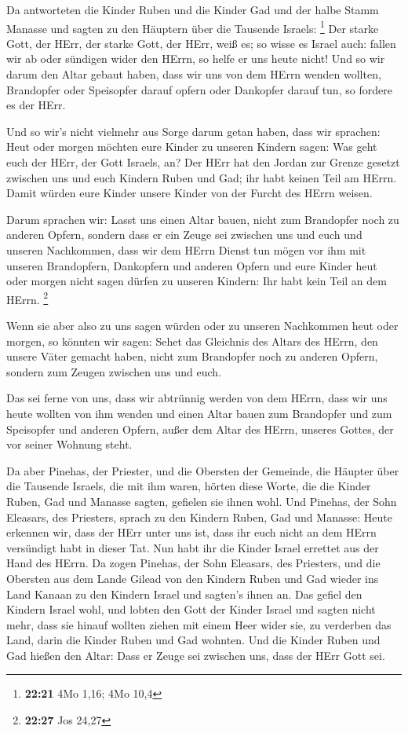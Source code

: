  Da antworteten die Kinder Ruben und die Kinder Gad und
der halbe Stamm Manasse und sagten zu den Häuptern über die Tausende
Israels: \footnote{\textbf{22:21} 4Mo 1,16; 4Mo 10,4} 
Der starke Gott, der HErr, der starke Gott, der HErr, weiß es; so wisse
es Israel auch: fallen wir ab oder sündigen wider den HErrn, so helfe er
uns heute nicht!  Und so wir darum den Altar gebaut
haben, dass wir uns von dem HErrn wenden wollten, Brandopfer oder
Speisopfer darauf opfern oder Dankopfer darauf tun, so fordere es der
HErr.

 Und so wir's nicht vielmehr aus Sorge darum getan haben,
dass wir sprachen: Heut oder morgen möchten eure Kinder zu unseren
Kindern sagen: Was geht euch der HErr, der Gott Israels, an?
 Der HErr hat den Jordan zur Grenze gesetzt zwischen uns
und euch Kindern Ruben und Gad; ihr habt keinen Teil am HErrn. Damit
würden eure Kinder unsere Kinder von der Furcht des HErrn weisen.

 Darum sprachen wir: Lasst uns einen Altar bauen, nicht
zum Brandopfer noch zu anderen Opfern,  sondern dass er
ein Zeuge sei zwischen uns und euch und unseren Nachkommen, dass wir dem
HErrn Dienst tun mögen vor ihm mit unseren Brandopfern, Dankopfern und
anderen Opfern und eure Kinder heut oder morgen nicht sagen dürfen zu
unseren Kindern: Ihr habt kein Teil an dem HErrn. \footnote{\textbf{22:27}
  Jos 24,27}

 Wenn sie aber also zu uns sagen würden oder zu unseren
Nachkommen heut oder morgen, so könnten wir sagen: Sehet das Gleichnis
des Altars des HErrn, den unsere Väter gemacht haben, nicht zum
Brandopfer noch zu anderen Opfern, sondern zum Zeugen zwischen uns und
euch.

 Das sei ferne von uns, dass wir abtrünnig werden von dem
HErrn, dass wir uns heute wollten von ihm wenden und einen Altar bauen
zum Brandopfer und zum Speisopfer und anderen Opfern, außer dem Altar
des HErrn, unseres Gottes, der vor seiner Wohnung steht.

 Da aber Pinehas, der Priester, und die Obersten der
Gemeinde, die Häupter über die Tausende Israels, die mit ihm waren,
hörten diese Worte, die die Kinder Ruben, Gad und Manasse sagten,
gefielen sie ihnen wohl.  Und Pinehas, der Sohn Eleasars,
des Priesters, sprach zu den Kindern Ruben, Gad und Manasse: Heute
erkennen wir, dass der HErr unter uns ist, dass ihr euch nicht an dem
HErrn versündigt habt in dieser Tat. Nun habt ihr die Kinder Israel
errettet aus der Hand des HErrn.  Da zogen Pinehas, der
Sohn Eleasars, des Priesters, und die Obersten aus dem Lande Gilead von
den Kindern Ruben und Gad wieder ins Land Kanaan zu den Kindern Israel
und sagten's ihnen an.  Das gefiel den Kindern Israel
wohl, und lobten den Gott der Kinder Israel und sagten nicht mehr, dass
sie hinauf wollten ziehen mit einem Heer wider sie, zu verderben das
Land, darin die Kinder Ruben und Gad wohnten.  Und die
Kinder Ruben und Gad hießen den Altar: Dass er Zeuge sei zwischen uns,
dass der HErr Gott sei.

